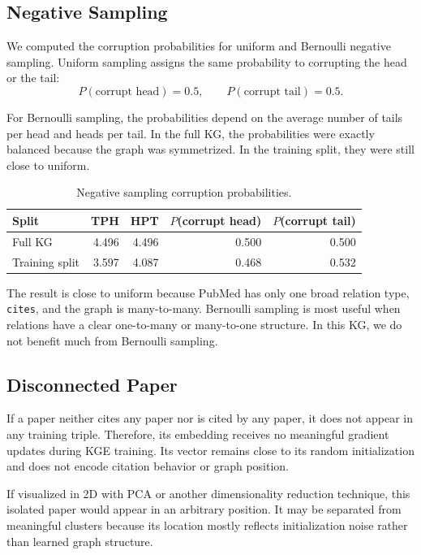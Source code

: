 \documentclass[11pt]{article}
\begin{document}
\subsection{Negative Sampling}

We computed the corruption probabilities for uniform and Bernoulli negative sampling. Uniform sampling assigns the same probability to corrupting the head or the tail:
\[
    P(\text{corrupt head}) = 0.5, \qquad P(\text{corrupt tail}) = 0.5.
\]

For Bernoulli sampling, the probabilities depend on the average number of tails per head and heads per tail. In the full KG, the probabilities were exactly balanced because the graph was symmetrized. In the training split, they were still close to uniform.

\begin{table}[H]
\centering
\caption{Negative sampling corruption probabilities.}
\begin{tabular}{lrrrr}
\toprule
Split & TPH & HPT & $P$(corrupt head) & $P$(corrupt tail) \\
\midrule
Full KG & 4.496 & 4.496 & 0.500 & 0.500 \\
Training split & 3.597 & 4.087 & 0.468 & 0.532 \\
\bottomrule
\end{tabular}
\end{table}

The result is close to uniform because PubMed has only one broad relation type, \texttt{cites}, and the graph is many-to-many. Bernoulli sampling is most useful when relations have a clear one-to-many or many-to-one structure. In this KG, we do not benefit much from Bernoulli sampling.

\subsection{Disconnected Paper}

If a paper neither cites any paper nor is cited by any paper, it does not appear in any training triple. Therefore, its embedding receives no meaningful gradient updates during KGE training. Its vector remains close to its random initialization and does not encode citation behavior or graph position.

If visualized in 2D with PCA or another dimensionality reduction technique, this isolated paper would appear in an arbitrary position. It may be separated from meaningful clusters because its location mostly reflects initialization noise rather than learned graph structure.
\end{document}
